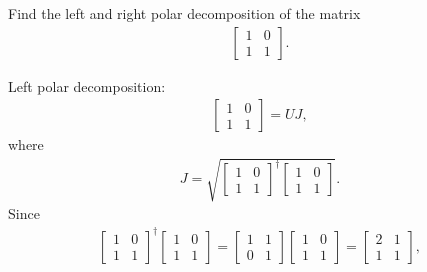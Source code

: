 \documentclass[en]{sol-man}
\begin{document}
\begin{exe}
    Find the left and right polar decomposition of the matrix
    \begin{align}
        \left[\begin{matrix}
            1&0\\
            1&1
        \end{matrix}\right].
    \end{align}
\end{exe}
\begin{sol}
    Left polar decomposition:
    \begin{align}
        \left[\begin{matrix}
            1&0\\
            1&1
        \end{matrix}\right]=UJ,
    \end{align}
    where
    \begin{align}
        J=\sqrt{\left[\begin{matrix}
            1&0\\
            1&1
        \end{matrix}\right]^{\dagger}\left[\begin{matrix}
            1&0\\
            1&1
        \end{matrix}\right]}.
    \end{align}
    Since
    \begin{align}
        \left[\begin{matrix}
            1&0\\
            1&1
        \end{matrix}\right]^{\dagger}\left[\begin{matrix}
            1&0\\
            1&1
        \end{matrix}\right]=\left[\begin{matrix}
            1&1\\
            0&1
        \end{matrix}\right]\left[\begin{matrix}
            1&0\\
            1&1
        \end{matrix}\right]=\left[\begin{matrix}
            2&1\\
            1&1
        \end{matrix}\right],
    \end{align}

\end{sol}
\end{document}
